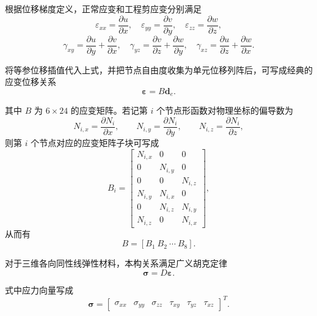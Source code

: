 \documentclass[12pt,a4paper]{article}
\begin{document}
根据位移梯度定义，正常应变和工程剪应变分别满足
\begin{equation}
\varepsilon_{xx}=\frac{\partial u}{\partial x},\quad
\varepsilon_{yy}=\frac{\partial v}{\partial y},\quad
\varepsilon_{zz}=\frac{\partial w}{\partial z},
\end{equation}
\begin{equation}
\gamma_{xy}=\frac{\partial u}{\partial y}+\frac{\partial v}{\partial x},\quad
\gamma_{yz}=\frac{\partial v}{\partial z}+\frac{\partial w}{\partial y},\quad
\gamma_{xz}=\frac{\partial u}{\partial z}+\frac{\partial w}{\partial x}.
\end{equation}

将等参位移插值代入上式，并把节点自由度收集为单元位移列阵后，可写成经典的应变位移关系
\begin{equation}
\bm{\varepsilon}=B\bm{d}_e.
\end{equation}

其中 $B$ 为 $6\times24$ 的应变矩阵。若记第 $i$ 个节点形函数对物理坐标的偏导数为
\begin{equation}
N_{i,x}=\frac{\partial N_i}{\partial x},\qquad
N_{i,y}=\frac{\partial N_i}{\partial y},\qquad
N_{i,z}=\frac{\partial N_i}{\partial z},
\end{equation}
则第 $i$ 个节点对应的应变矩阵子块可写成
\begin{equation}
B_i=
\begin{bmatrix}
N_{i,x} & 0 & 0 \\
0 & N_{i,y} & 0 \\
0 & 0 & N_{i,z} \\
N_{i,y} & N_{i,x} & 0 \\
0 & N_{i,z} & N_{i,y} \\
N_{i,z} & 0 & N_{i,x}
\end{bmatrix},
\end{equation}
从而有
\begin{equation}
B=[B_1\ B_2\ \cdots\ B_8].
\end{equation}

对于三维各向同性线弹性材料，本构关系满足广义胡克定律
\begin{equation}
\bm{\sigma}=D\bm{\varepsilon}.
\end{equation}

式中应力向量写成
\begin{equation}
\bm{\sigma}=
\begin{bmatrix}
\sigma_{xx} & \sigma_{yy} & \sigma_{zz} & \tau_{xy} & \tau_{yz} & \tau_{xz}
\end{bmatrix}^T.
\end{equation}
\end{document}
